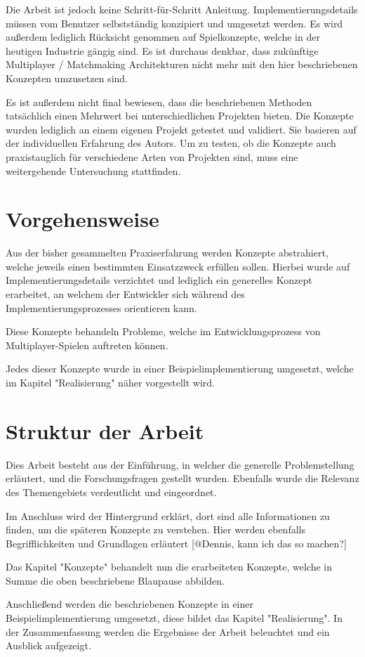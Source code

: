Die Arbeit ist jedoch keine Schritt-für-Schritt Anleitung. Implementierungsdetails müssen vom Benutzer selbstständig konzipiert und umgesetzt werden. Es wird außerdem lediglich Rücksicht genommen auf Spielkonzepte, welche in der heutigen Industrie gängig sind. Es ist durchaus denkbar, dass zukünftige Multiplayer / Matchmaking Architekturen nicht mehr mit den hier beschriebenen Konzepten umzusetzen sind.

Es ist außerdem nicht final bewiesen, dass die beschriebenen Methoden tatsächlich einen Mehrwert bei unterschiedlichen Projekten bieten. Die Konzepte wurden lediglich an einem eigenen Projekt getestet und validiert. Sie basieren auf der individuellen Erfahrung des Autors. Um zu testen, ob die Konzepte auch praxistauglich für verschiedene Arten von Projekten sind, muss eine weitergehende Untersuchung stattfinden.




\section{Vorgehensweise}

Aus der bisher gesammelten Praxiserfahrung werden Konzepte abstrahiert, welche jeweils einen bestimmten Einsatzzweck erfüllen sollen. Hierbei wurde auf Implementierungsdetails verzichtet und lediglich ein generelles Konzept erarbeitet, an welchem der Entwickler sich während des Implementierungsprozesses orientieren kann.

Diese Konzepte behandeln Probleme, welche im Entwicklungsprozess von Multiplayer-Spielen auftreten können. 

Jedes dieser Konzepte wurde in einer Beispielimplementierung umgesetzt, welche im Kapitel "Realisierung" näher vorgestellt wird.

\section{Struktur der Arbeit}

Dies Arbeit besteht aus der Einführung, in welcher die generelle Problemstellung erläutert, und die Forschungsfragen gestellt wurden. Ebenfalls wurde die Relevanz des Themengebiets verdeutlicht und eingeordnet.

Im Anschluss wird der Hintergrund erklärt, dort sind alle Informationen zu finden, um die späteren Konzepte zu verstehen. Hier werden ebenfalls Begrifflichkeiten und Grundlagen erläutert [@Dennis, kann ich das so machen?]

Das Kapitel "Konzepte" behandelt nun die erarbeiteten Konzepte, welche in Summe die oben beschriebene Blaupause abbilden. 
 
Anschließend werden die beschriebenen Konzepte in einer Beispielimplementierung umgesetzt, diese bildet das Kapitel "Realisierung". In der Zusammenfassung werden die Ergebnisse der Arbeit beleuchtet und ein Ausblick aufgezeigt.
